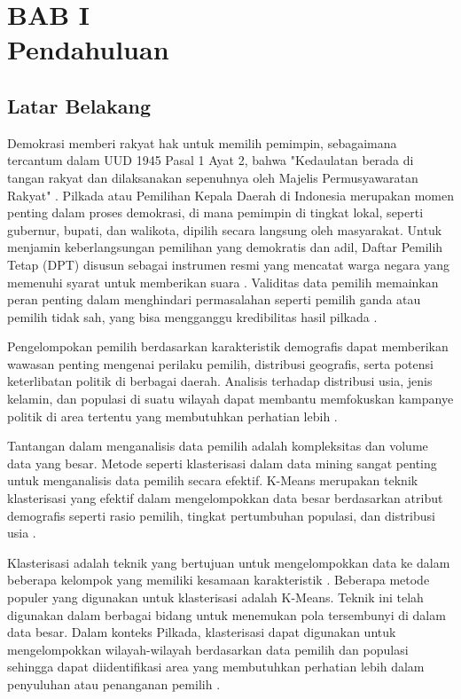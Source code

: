 \section*{\centering BAB I \\ Pendahuluan}

\setcounter{section}{1}

\subsection{Latar Belakang}
Demokrasi memberi rakyat hak untuk memilih pemimpin, sebagaimana tercantum dalam UUD 1945 Pasal 1 Ayat 2, bahwa "Kedaulatan berada di tangan rakyat dan dilaksanakan sepenuhnya oleh Majelis Permusyawaratan Rakyat" \cite{PasalDemokrasi}. Pilkada atau Pemilihan Kepala Daerah di Indonesia merupakan momen penting dalam proses demokrasi, di mana pemimpin di tingkat lokal, seperti gubernur, bupati, dan walikota, dipilih secara langsung oleh masyarakat. Untuk menjamin keberlangsungan pemilihan yang demokratis dan adil, Daftar Pemilih Tetap (DPT) disusun sebagai instrumen resmi yang mencatat warga negara yang memenuhi syarat untuk memberikan suara \cite{DPTPilkada}. Validitas data pemilih memainkan peran penting dalam menghindari permasalahan seperti pemilih ganda atau pemilih tidak sah, yang bisa mengganggu kredibilitas hasil pilkada \cite{InstrumenDpt}.

Pengelompokan pemilih berdasarkan karakteristik demografis dapat memberikan wawasan penting mengenai perilaku pemilih, distribusi geografis, serta potensi keterlibatan politik di berbagai daerah. Analisis terhadap distribusi usia, jenis kelamin, dan populasi di suatu wilayah dapat membantu memfokuskan kampanye politik di area tertentu yang membutuhkan perhatian lebih \cite{ImplementasiDataPemilihBerkelanjutan}.

Tantangan dalam menganalisis data pemilih adalah kompleksitas dan volume data yang besar. Metode seperti klasterisasi dalam data mining sangat penting untuk menganalisis data pemilih secara efektif.  K-Means merupakan teknik klasterisasi yang efektif dalam mengelompokkan data besar berdasarkan atribut demografis seperti rasio pemilih, tingkat pertumbuhan populasi, dan distribusi usia \cite{KMeansMethod}.

Klasterisasi adalah teknik yang bertujuan untuk mengelompokkan data ke dalam beberapa kelompok yang memiliki kesamaan karakteristik \cite{FormulaKMeans}. Beberapa metode populer yang digunakan untuk klasterisasi adalah K-Means. Teknik ini telah digunakan dalam berbagai bidang untuk menemukan pola tersembunyi di dalam data besar. Dalam konteks Pilkada, klasterisasi dapat digunakan untuk mengelompokkan wilayah-wilayah berdasarkan data pemilih dan populasi sehingga dapat diidentifikasi area yang membutuhkan perhatian lebih dalam penyuluhan atau penanganan pemilih \cite{DataMiningTechniques}.

